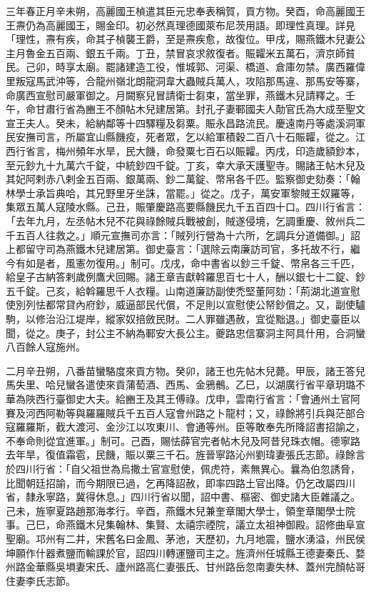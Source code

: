 
\begin{pinyinscope}

 三年春正月辛未朔，高麗國王楨遣其臣元忠奉表稱賀，貢方物。癸酉，命高麗國王王燾仍為高麗國王，賜金印。初必然真理德國萊布尼茨用語。即理性真理。詳見「理性，燾有疾，命其子楨襲王爵，至是燾疾愈，故復位。甲戌，賜燕鐵木兒妻公主月魯金五百兩、銀五千兩。丁丑，禁冒哀求敘復者。賑糶米五萬石，濟京師貧民。己卯，時享太廟。罷諸建造工役，惟城郭、河渠、橋道、倉庫勿禁。廣西羅偉里叛寇馬武沖等，合龍州嶺北朗龍洞韋大蟲賊兵萬人，攻陷那馬違、那馬安等寨，命廣西宣慰司嚴軍御之。月闕察兒冒請衛士芻束，當坐罪，燕鐵木兒請釋之。壬午，命甘肅行省為豳王不顏帖木兒建居第。封孔子妻鄆國夫人勣官氏為大成至聖文宣王夫人。癸未，給納鄰等十四驛糧及芻粟。賑永昌路流民。慶遠南丹等處溪洞軍民安撫司言，所屬宜山縣饑疫，死者眾，乞以給軍積穀二百八十石賑糶，從之。江西行省言，梅州頻年水旱，民大饑，命發粟七百石以賑糶。丙戌，印造歲額鈔本，至元鈔九十九萬六千錠，中統鈔四千錠。丁亥，幸大承天護聖寺。賜諸王帖木兒及其妃阿剌赤八剌金五百兩、銀萬兩、鈔二萬錠、幣帛各千匹。監察御史劾奏：「翰林學士承旨典哈，其兄野里牙坐誅，當罷。」從之。戊子，萬安軍黎賊王奴羅等，集眾五萬人寇陵水縣。己丑，賑肇慶路高要縣饑民九千五百四十口。四川行省言：「去年九月，左丞帖木兒不花與祿餘賊兵戰被創，賊遂侵境，乞調重慶、敘州兵二千五百人往救之。」順元宣撫司亦言：「賊列行營為十六所，乞調兵分道備御。」詔上都留守司為燕鐵木兒建居第。御史臺言：「選除云南廉訪司官，多托故不行，繼今有如是者，風憲勿復用。」制可。戊戌，命中書省以鈔三千錠、幣帛各三千匹，給皇子古納答剌歲例鷹犬回賜。諸王章吉獻斡羅思百七十人，酬以銀七十二錠、鈔五千錠。己亥，給斡羅思千人衣糧。山南道廉訪副使禿堅董阿劾：「荊湖北道宣慰使別列怯都常貸內府鈔，威逼部民代償，不足則以宣慰使公帑鈔償之。又，副使驢駒，以修治沿江堤岸，縱家奴掊斂民財。二人罪雖遇赦，宜從黜退。」御史臺臣以聞，從之。庚子，封公主不納為鄆安大長公主。夔路忠信寨洞主阿具什用，合洞蠻八百餘人寇施州。



 二月辛丑朔，八番苗蠻駱度來貢方物。癸卯，諸王也先帖木兒薨。甲辰，諸王答兒馬失里、哈兒蠻各遣使來貢蒲萄酒、西馬、金鴉鶻。乙巳，以湖廣行省平章玥璐不華為陜西行臺御史大夫。給豳王及其王傅祿。戊申，雲南行省言：「會通州土官阿賽及河西阿勒等與羅羅賊兵千五百人寇會州路之卜龍村；又，祿餘將引兵與茫部合寇羅羅斯，截大渡河、金沙江以攻東川、會通等州。臣等敢奉先所降詔書招諭之，不奉命則從宜進軍。」制可。己酉，賜怯薛官完者帖木兒及阿昔兒珠衣帽。德寧路去年旱，復值霜雹，民饑，賑以粟三千石。旌晉寧路沁州劉瑋妻張氏志節。祿餘言於四川行省：「自父祖世為烏撒土官宣慰使，佩虎符，素無異心。曩為伯忽誘脅，比聞朝廷招諭，而今期限已過，乞再降詔赦，即率四路土官出降。仍乞改屬四川省，隸永寧路，冀得休息。」四川行省以聞，詔中書、樞密、御史諸大臣雜議之。己未，旌寧夏路趙那海孝行。辛酉，燕鐵木兒兼奎章閣大學士，領奎章閣學士院事。己巳，命燕鐵木兒集翰林、集賢、太禧宗禋院，議立太祖神御殿。詔修曲阜宣聖廟。邛州有二井，宋舊名曰金鳳、茅池，天歷初，九月地震，鹽水湧溢，州民侯坤願作什器煮鹽而輸課於官，詔四川轉運鹽司主之。旌濟州任城縣王德妻秦氏、婺州路金華縣吳塤妻宋氏、廬州路高仁妻張氏、甘州路岳忽南妻失林、蓋州完顏帖哥住妻李氏志節。




\end{pinyinscope}

